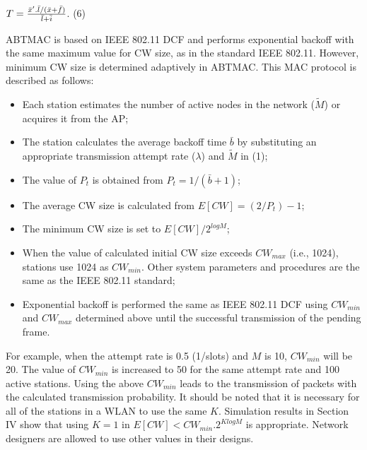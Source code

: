 \documentclass[10pt,twocolumn,oneside,submit]{JCNtran}
\begin{document}
\\
$T = {\bar x'.\bar l/(\bar x+\bar f)\over\bar l+\bar i}$. \hfill(6) \\
\par ABTMAC is based on IEEE 802.11 DCF and performs exponential backoff with the same maximum value for CW size, as in the standard IEEE 802.11. However, minimum CW size is determined adaptively in ABTMAC. This MAC protocol is described as follows:\\
\begin{itemize}
\item
Each station estimates the number of active nodes in the network ($\tilde M$) or acquires it from the AP;
\item
The station calculates the average backoff time $\bar b$ by substituting an appropriate transmission attempt rate ($\lambda $) and $\tilde M$ in (1);
\item
The value of $P_t$ is obtained from $P_t=1/(\bar b+1)$;
\item
The average CW size is calculated from $E[CW]=(2/P_t)-1$;
\item
The minimum CW size is set to $E[CW]/2^{logM}$;
\item
When the value of calculated initial CW size exceeds $CW_{max}$ (i.e., 1024), stations use 1024 as $CW_{min}$. Other system parameters and procedures are the same as the IEEE 802.11 standard;
\item
Exponential backoff is performed the same as IEEE 802.11 DCF using $CW_{min}$ and $CW_{max}$ determined above until the successful transmission of the pending frame.\\
\end{itemize}
For example, when the attempt rate is 0.5 (1/slots) and $M$ is 10, $CW_{min}$ will be 20. The value of $CW_{min}$ is increased to 50 for the same attempt rate and 100 active stations. Using the above $CW_{min}$ leads to the transmission of packets with the calculated transmission probability. It should be noted that it is necessary for all of the stations in a WLAN to use the same $K$. Simulation results in Section IV show that using $K=1$ in $E[CW]<CW_{min}.2^{KlogM}$ is appropriate. Network designers are allowed to use other values in their designs. 
\end{document}
